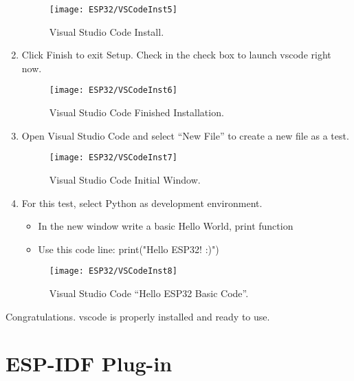 \begin{enumerate}
\begin{figure}  [H]
\begin{center}
            \texttt{[image: ESP32/VSCodeInst5]}
            \caption{Visual Studio Code Install.} 
            \label{fig:Visual Studio Code Install.}
        \end{center}
    \end{figure}
    \item Click Finish to exit Setup. Check in the check box to launch \ac{vscode} right now.
    \begin{figure}  [H]
        \begin{center}
            \texttt{[image: ESP32/VSCodeInst6]}
            \caption{Visual Studio Code Finished Installation.} 
            \label{fig:Visual Studio Code Finished Installation.}
        \end{center}
    \end{figure}
    \item Open Visual Studio Code and select ``New File'' to create a new file as a test.
    \begin{figure}  [H]
        \begin{center}
            \texttt{[image: ESP32/VSCodeInst7]}
            \caption{Visual Studio Code Initial Window.} 
            \label{fig:Visual Studio Code Initial Window.}
        \end{center}
    \end{figure}
    \item For this test, select Python as development environment. 
    \begin{itemize}
        \item In the new window write a basic Hello World, print function
        \item Use this code line: print("Hello ESP32! :)")
    \end{itemize}
    \begin{figure}  [H]
        \begin{center}
            \texttt{[image: ESP32/VSCodeInst8]}
            \caption{Visual Studio Code ``Hello ESP32 Basic Code''.} 
            \label{fig:Visual Studio Code "Hello ESP32 Basic Code."}
        \end{center}
    \end{figure}
\end{enumerate}

Congratulations. \ac{vscode} is properly installed and ready to use.

\section{ESP-IDF Plug-in}

